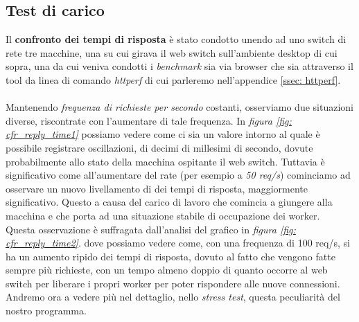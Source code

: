 \documentclass[italian]{tktltiki2}
\begin{document}
\subsection{Test di carico}
Il \textbf{confronto dei tempi di risposta} è stato condotto unendo ad uno switch di rete tre macchine, una su cui girava il web switch sull'ambiente desktop di cui sopra, una da cui veniva condotti i \emph{benchmark} sia via browser che sia attraverso il tool da linea di comando \emph{httperf} di cui parleremo nell'appendice \ref{ssec: httperf}. \\\\
Mantenendo \emph{frequenza di richieste per secondo} costanti, osserviamo due situazioni diverse, riscontrate con l'aumentare di tale frequenza. In \emph{figura \ref{fig: cfr_reply_time1}} possiamo vedere come ci sia un valore intorno al quale è possibile registrare oscillazioni, di decimi di millesimi di secondo, dovute probabilmente allo stato della macchina ospitante il web switch. Tuttavia è significativo come all'aumentare del rate (per esempio a \emph{50 req/s}) cominciamo ad osservare un nuovo livellamento di dei tempi di risposta, maggiormente significativo. Questo a causa del carico di lavoro che comincia a giungere alla macchina e che porta ad una situazione stabile di occupazione dei worker. \\ 
Questa osservazione è suffragata dall'analisi del grafico in \emph{figura \ref{fig: cfr_reply_time2}}. dove possiamo vedere come, con una frequenza di 100 req/s, si ha un aumento ripido dei tempi di risposta, dovuto al fatto che vengono fatte sempre più richieste, con un tempo almeno doppio di quanto occorre al web switch per liberare i propri worker per poter rispondere alle nuove connessioni. Andremo ora a vedere più nel dettaglio, nello \emph{stress test}, questa peculiarità del nostro programma.
\end{document}
